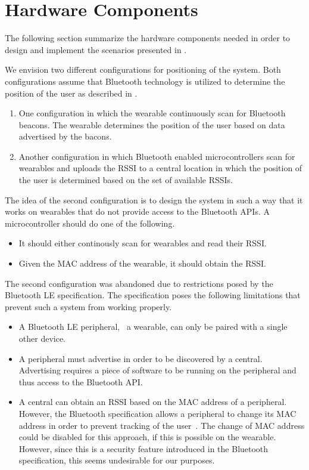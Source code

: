 \section{Hardware Components}
\label{sec:analysis:system-components}

The following section summarize the hardware components needed in order to design and implement the scenarios presented in .

We envision two different configurations for positioning of the system. Both configurations assume that Bluetooth technology is utilized to determine the position of the user as described in .

\begin{enumerate}
\item One configuration in which the wearable continuously scan for Bluetooth beacons. The wearable determines the position of the user based on data advertised by the bacons.
\item Another configuration in which Bluetooth enabled microcontrollers scan for wearables and uploads the RSSI to a central location in which the position of the user is determined based on the set of available RSSIs.
\end{enumerate}

The idea of the second configuration is to design the system in such a way that it works on wearables that do not provide access to the Bluetooth APIs. A microcontroller should do one of the following.

\begin{itemize}
\item It should either continously scan for wearables and read their RSSI.
\item Given the MAC address of the wearable, it should obtain the RSSI.
\end{itemize}

The second configuration was abandoned due to restrictions posed by the Bluetooth LE specification. The specification poses the following limitations that prevent such a system from working properly.

\begin{itemize}
\item A Bluetooth LE peripheral, \eg~a wearable, can only be paired with a single other device.
\item A peripheral must advertise in order to be discovered by a central. Advertising requires a piece of software to be running on the peripheral and thus access to the Bluetooth API.
\item A central can obtain an RSSI based on the MAC address of a peripheral. However, the Bluetooth specification allows a peripheral to change its MAC address in order to prevent tracking of the user~\cite[p.~91]{Bluetooth2010Bluetooth_vol_1}. The change of MAC address could be disabled for this approach, if this is possible on the wearable. However, since this is a security feature introduced in the Bluetooth specification, this seems undesirable for our purposes.
\end{itemize}

